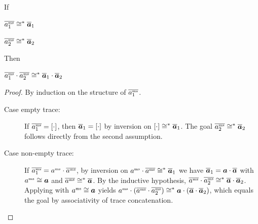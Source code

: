 \begin{lemma}\label{lem:trace-agree-trans}
  If
  \begin{assumptions}
    \item $\tmstraceagree[^{*}]{\mstrace[_{1}]}{\abstrace_{1}}$
    \item $\tmstraceagree[^{*}]{\mstrace[_{2}]}{\abstrace_{2}}$
  \end{assumptions}
  Then
  \begin{goals}
    \item $\tmstraceagree[^{*}]{\mstrace[_{1}]\cdot\mstrace[_{2}]}{\abstrace_{1}\cdot\abstrace_{2}}$
  \end{goals}
\end{lemma}
\begin{proof}
  By induction on the structure of $\mstrace[_{1}]$.
  \begin{description}
    \item[Case empty trace:]
      If $\mstrace[_{1}]=\hole{\cdot}$, then $\abstrace_{1}=\hole{\cdot}$ by inversion on $\tmstraceagree[^{*}]{\hole{\cdot}}{\abstrace_{1}}$.
      The goal $\tmstraceagree[^{*}]{\mstrace[_{2}]}{\abstrace_{2}}$ follows directly from the second assumption.
    \item[Case non-empty trace:]
      If $\mstrace[_{1}]=\msevent\cdot\mstrace$, by inversion on $\tmstraceagree[^{*}]{\msevent\cdot\mstrace}{\abstrace_{1}}$ we have $\abstrace_{1}=\absevent\cdot\abstrace$ with $\tmstraceagree{\msevent}{\absevent}$ and $\tmstraceagree[^{*}]{\mstrace}{\abstrace}$.
      By the inductive hypothesis, $\tmstraceagree[^{*}]{\mstrace\cdot\mstrace[_{2}]}{\abstrace\cdot\abstrace_{2}}$.
      Applying  with $\tmstraceagree{\msevent}{\absevent}$ yields $\tmstraceagree[^{*}]{\msevent\cdot(\mstrace\cdot\mstrace[_{2}])}{\absevent\cdot(\abstrace\cdot\abstrace_{2})}$, which equals the goal by associativity of trace concatenation.
  \end{description}
\end{proof}


